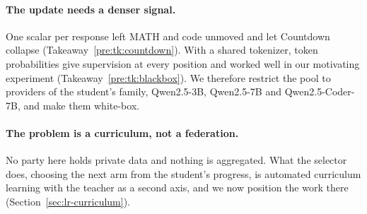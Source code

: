 \paragraph{The update needs a denser signal.} One scalar per response left MATH and code
unmoved and let Countdown collapse (Takeaway~\ref{pre:tk:countdown}). With a shared
tokenizer, token probabilities give supervision at every position and worked well in our
motivating experiment (Takeaway~\ref{pre:tk:blackbox}). We therefore restrict the pool to
providers of the student's family, Qwen2.5-3B, Qwen2.5-7B and Qwen2.5-Coder-7B, and make
them white-box.

\paragraph{The problem is a curriculum, not a federation.} No party here holds private
data and nothing is aggregated. What the selector does, choosing the next arm from the
student's progress, is automated curriculum learning with the teacher as a second axis,
and we now position the work there (Section~\ref{sec:lr-curriculum}).
